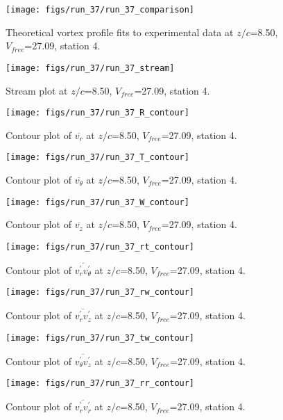 \begin{figure}[H]
\centering
\texttt{[image: figs/run\_37/run\_37\_comparison]}
\caption{Theoretical vortex profile fits to experimental data at $z/c$=8.50, $V_{free}$=27.09, station 4.}
\end{figure}


\begin{figure}[H]
\centering
\texttt{[image: figs/run\_37/run\_37\_stream]}
\caption{Stream plot at $z/c$=8.50, $V_{free}$=27.09, station 4.}
\end{figure}


\begin{figure}[H]
\centering
\texttt{[image: figs/run\_37/run\_37\_R\_contour]}
\caption{Contour plot of $\overline{v_{r}}$ at $z/c$=8.50, $V_{free}$=27.09, station 4.}
\end{figure}


\begin{figure}[H]
\centering
\texttt{[image: figs/run\_37/run\_37\_T\_contour]}
\caption{Contour plot of $\overline{v_{\theta}}$ at $z/c$=8.50, $V_{free}$=27.09, station 4.}
\end{figure}


\begin{figure}[H]
\centering
\texttt{[image: figs/run\_37/run\_37\_W\_contour]}
\caption{Contour plot of $\overline{v_{z}}$ at $z/c$=8.50, $V_{free}$=27.09, station 4.}
\end{figure}


\begin{figure}[H]
\centering
\texttt{[image: figs/run\_37/run\_37\_rt\_contour]}
\caption{Contour plot of $\overline{v_{r}^{\prime} v_{\theta}^{\prime}}$ at $z/c$=8.50, $V_{free}$=27.09, station 4.}
\end{figure}


\begin{figure}[H]
\centering
\texttt{[image: figs/run\_37/run\_37\_rw\_contour]}
\caption{Contour plot of $\overline{v_{r}^{\prime} v_{z}^{\prime}}$ at $z/c$=8.50, $V_{free}$=27.09, station 4.}
\end{figure}


\begin{figure}[H]
\centering
\texttt{[image: figs/run\_37/run\_37\_tw\_contour]}
\caption{Contour plot of $\overline{v_{\theta}^{\prime} v_{z}^{\prime}}$ at $z/c$=8.50, $V_{free}$=27.09, station 4.}
\end{figure}


\begin{figure}[H]
\centering
\texttt{[image: figs/run\_37/run\_37\_rr\_contour]}
\caption{Contour plot of $\overline{v_{r}^{\prime} v_{r}^{\prime}}$ at $z/c$=8.50, $V_{free}$=27.09, station 4.}
\end{figure}


